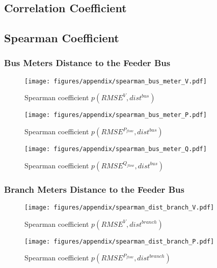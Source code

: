 \begin{appendices}

\chapter{Correlation Coefficient}

\section{Spearman Coefficient}
\subsection{Bus Meters Distance to the Feeder Bus}
    \begin{figure}[!htb]
        \centering
        \texttt{[image: figures/appendix/spearman\_bus\_meter\_V.pdf]}
        \caption{Spearman coefficient $p(RMSE^V,dist^{bus})$}
    \end{figure}

    \begin{figure}[!htb]
        \centering
        \texttt{[image: figures/appendix/spearman\_bus\_meter\_P.pdf]}
        \caption{Spearman coefficient $p(RMSE^{P_{flow}},dist^{bus})$}
    \end{figure}
    
    \begin{figure}[!htb]
        \centering
        \texttt{[image: figures/appendix/spearman\_bus\_meter\_Q.pdf]}
        \caption{Spearman coefficient $p(RMSE^{Q_{flow}},dist^{bus})$}
    \end{figure}
    
\FloatBarrier

\subsection{Branch Meters Distance to the Feeder Bus}

    \begin{figure}[!htb]
        \centering
        \texttt{[image: figures/appendix/spearman\_dist\_branch\_V.pdf]}
        \caption{Spearman coefficient $p(RMSE^V,dist^{branch})$}
    \end{figure}

    \begin{figure}[!htb]
        \centering
        \texttt{[image: figures/appendix/spearman\_dist\_branch\_P.pdf]}
        \caption{Spearman coefficient $p(RMSE^{P_{flow}},dist^{branch})$}
    \end{figure}
    

\end{appendices}
